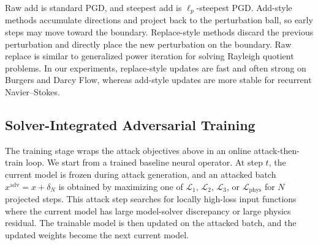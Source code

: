\documentclass[letterpaper]{article} %
\begin{document}
\begin{table}[t]
\centering
\footnotesize
\setlength{\tabcolsep}{4pt}
\end{table}

Raw add is standard PGD, and steepest add is $\ell_p$-steepest PGD.
Add-style methods accumulate directions and project back
to the perturbation ball, so early steps may move toward the boundary.
Replace-style methods discard the previous perturbation and directly place the
new perturbation on the boundary. Raw replace is similar to generalized power
iteration for solving Rayleigh quotient problems.
In our experiments, replace-style updates are fast and often strong on Burgers
and Darcy Flow, whereas add-style updates are more stable for recurrent
Navier--Stokes.

\subsection{Solver-Integrated Adversarial Training}

The training stage wraps the attack objectives above in an online
attack-then-train loop. We start from a trained baseline neural operator. At
step $t$, the current model is frozen during attack generation, and an attacked
batch $x^{\mathrm{adv}}=x+\delta_N$ is obtained by maximizing one of
$\mathcal{L}_1$, $\mathcal{L}_2$, $\mathcal{L}_3$, or
$\mathcal{L}_{\mathrm{phys}}$ for $N$ projected steps. This attack step searches
for locally high-loss input functions where the current model has large
model-solver discrepancy or large physics residual. The trainable model is
then updated on the attacked batch, and the updated weights become the next
current model.
\end{document}
